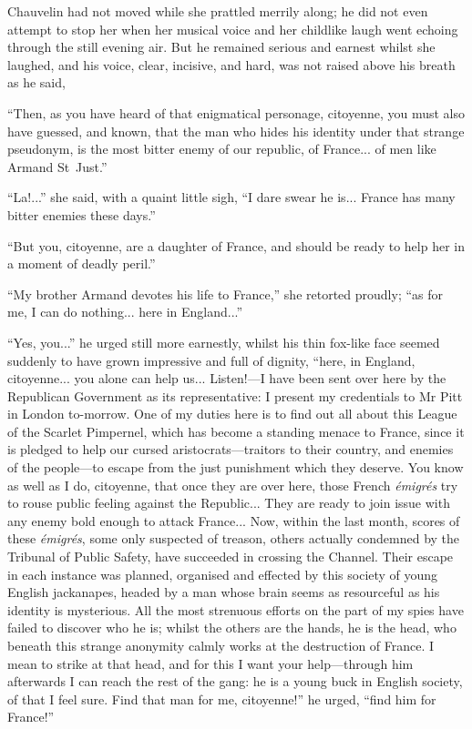 Chauvelin had not moved while she prattled merrily along; he did not even attempt to stop her when her musical voice and her childlike laugh went echoing through the still evening air. But he remained serious and earnest whilst she laughed, and his voice, clear, incisive, and hard, was not raised above his breath as he said,\longdash


\enquote{Then, as you have heard of that enigmatical personage, citoyenne, you must also have guessed, and known, that the man who hides his identity under that strange pseudonym, is the most bitter enemy of our republic, of France... of men like Armand St~Just.}

\enquote{La!...} she said, with a quaint little sigh, \enquote{I dare swear he is... France has many bitter enemies these days.}

\enquote{But you, citoyenne, are a daughter of France, and should be ready to help her in a moment of deadly peril.}

\enquote{My brother Armand devotes his life to France,} she retorted proudly; \enquote{as for me, I can do nothing... here in England...}

\enquote{Yes, you...} he urged still more earnestly, whilst his thin fox-like face seemed suddenly to have grown impressive and full of dignity, \enquote{here, in England, citoyenne... you alone can help us... Listen!---I have been sent over here by the Republican Government as its representative: I present my credentials to Mr Pitt in London to-morrow. One of my duties here is to find out all about this League of the Scarlet Pimpernel, which has become a standing menace to France, since it is pledged to help our cursed aristocrats---traitors to their country, and enemies of the people---to escape from the just punishment which they deserve. You know as well as I do, citoyenne, that once they are over here, those French \textit{émigrés} try to rouse public feeling against the Republic... They are ready to join issue with any enemy bold enough to attack France... Now, within the last month, scores of these \textit{émigrés}, some only suspected of treason, others actually condemned by the Tribunal of Public Safety, have succeeded in crossing the Channel. Their escape in each instance was planned, organised and effected by this society of young English jackanapes, headed by a man whose brain seems as resourceful as his identity is mysterious. All the most strenuous efforts on the part of my spies have failed to discover who he is; whilst the others are the hands, he is the head, who beneath this strange anonymity calmly works at the destruction of France. I mean to strike at that head, and for this I want your help---through him afterwards I can reach the rest of the gang: he is a young buck in English society, of that I feel sure. Find that man for me, citoyenne!} he urged, \enquote{find him for France!}


